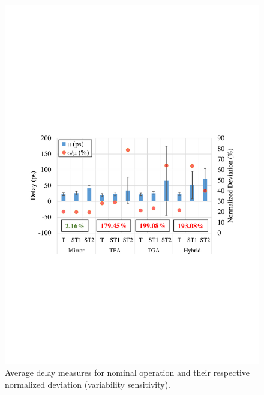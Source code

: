 \documentclass[pgmicro,mestrado,english]{iiufrgs}
\begin{document}
\begin{figure}[]
  \centering
    \includegraphics[width=\textwidth, trim={2cm 10cm 2cm 10.5cm}, clip]{averageDelayNominal.pdf}
     \caption{Average delay measures for nominal operation and their respective normalized deviation (variability sensitivity).}
  \label{fig:avgDelayNominal}
\end{figure}

\end{document}
